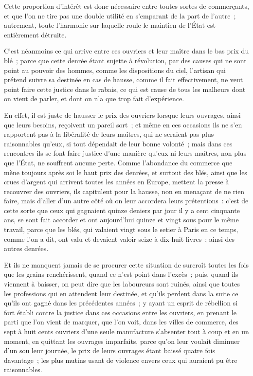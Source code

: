 \documentclass[french,twoside]{book} %
\begin{document}
Cette proportion d’intérêt est donc nécessaire entre toutes sortes de commerçants, et que l’on ne tire pas une double utilité en s’emparant de la part de l’autre ; autrement, toute l’harmonie sur laquelle roule le maintien de l’État est entièrement détruite.\par
C’est néanmoins ce qui arrive entre ces ouvriers et leur maître dans le bas prix du blé ; parce que cette denrée étant sujette à révolution, par des causes qui ne sont point au pouvoir des hommes, comme les dispositions du ciel, l’artisan qui prétend suivre sa destinée en cas de hausse, comme il fait effectivement, ne veut point faire cette justice dans le rabais, ce qui est cause de tous les malheurs dont on vient de parler, et dont on n’a que trop fait d’expérience.\par
En effet, il est juste de hausser le prix des ouvriers lorsque leurs ouvrages, ainsi que leurs besoins, reçoivent un pareil sort ; et même en ces occasions ils ne s’en rapportent pas à la libéralité de leurs maîtres, qui ne seraient pas plus raisonnables qu’eux, si tout dépendait de leur bonne volonté ; mais dans ces rencontres ils se font faire justice d’une manière qu’eux ni leurs maîtres, non plus que l’État, ne souffrent aucune perte. Comme l’abondance du commerce que mène toujours après soi le haut prix des denrées, et surtout des blés, ainsi que les crues d’argent qui arrivent toutes les années en Europe, mettent la presse à recouvrer des ouvriers, ils capitulent pour la hausse, non en menaçant de ne rien faire, mais d’aller d’un autre côté où on leur accordera leurs prétentions : c’est de cette sorte que ceux qui gagnaient quinze deniers par jour il y a cent cinquante ans, se sont fait accorder et ont aujourd’hui quinze et vingt sous pour le même travail, parce que les blés, qui valaient vingt sous le setier à Paris en ce temps, comme l’on a dit, ont valu et devaient valoir seize à dix-huit livres ; ainsi des autres denrées.\par
Et ils ne manquent jamais de se procurer cette situation de surcroît toutes les fois que les grains renchérissent, quand ce n’est point dans l’excès ; puis, quand ils viennent à baisser, on peut dire que les laboureurs sont ruinés, ainsi que toutes les professions qui en attendent leur destinée, et qu’ils perdent dans la suite ce qu’ils ont gagné dans les précédentes années ; y ayant un esprit de rébellion si fort établi contre la justice dans ces occasions entre les ouvriers, en prenant le parti que l’on vient de marquer, que l’on voit, dans les villes de commerce, des sept à huit cents ouvriers d’une seule manufacture s’absenter tout à coup et en un moment, en quittant les ouvrages imparfaits, parce qu’on leur voulait diminuer d’un sou leur journée, le prix de leurs ouvrages étant baissé quatre fois davantage ; les plus mutins usant de violence envers ceux qui auraient pu être raisonnables.\par
\end{document}

